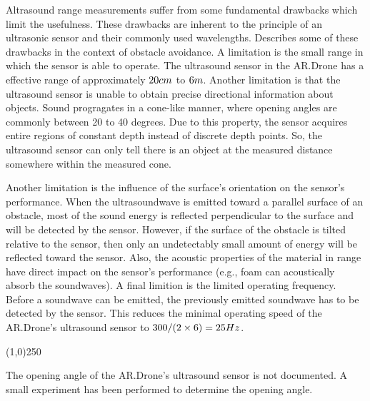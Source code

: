 Altrasound range measurements suffer from some fundamental drawbacks which limit the usefulness.
These drawbacks are inherent to the principle of an ultrasonic sensor and their commonly used wavelengths.
\cite{borenstein1988obstacle} Describes some of these drawbacks in the context of obstacle avoidance.
A limitation is the small range in which the sensor is able to operate.
The ultrasound sensor in the AR.Drone has a effective range of approximately $20\small{cm}$ to $6\small{m}$.
Another limitation is that the ultrasound sensor is unable to obtain precise directional information about objects.
Sound progragates in a cone-like manner, where opening angles are commonly between 20 to 40 degrees.
Due to this property, the sensor acquires entire regions of constant depth instead of discrete depth points.
So, the ultrasound sensor can only tell there is an object at the measured distance somewhere within the measured cone.

Another limitation is the influence of the surface's orientation on the sensor's performance.
When the ultrasoundwave is emitted toward a parallel surface of an obstacle, most of the sound energy is reflected perpendicular to the surface and will be detected by the sensor.
However, if the surface of the obstacle is tilted relative to the sensor, then only an undetectably small amount of energy will be reflected toward the sensor.
Also, the acoustic properties of the material in range have direct impact on the sensor's performance (e.g., foam can acoustically absorb the soundwaves).
A final limition is the limited operating frequency.
Before a soundwave can be emitted, the previously emitted soundwave has to be detected by the sensor.
This reduces the minimal operating speed of the AR.Drone's ultrasound sensor to $300 / (2 \times 6) = 25\small{Hz}$.

\begin{center}
\line(1,0){250}
\end{center}
\color{mediumgray}
\small

The opening angle of the AR.Drone's ultrasound sensor is not documented.
A small experiment has been performed to determine the opening angle.

